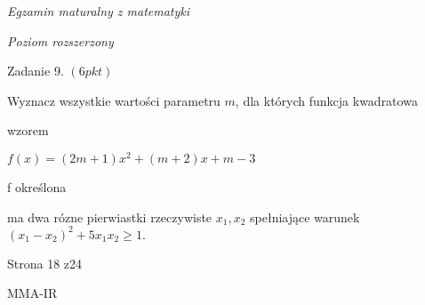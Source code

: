 \documentclass[a4paper,12pt]{article}
\begin{document}
{\it Egzamin maturalny z matematyki}

{\it Poziom rozszerzony}

Zadanie 9. $(6pkt)$

Wyznacz wszystkie wartości parametru $m$, dla których funkcja kwadratowa

wzorem

$f(x)=(2m+1)x^{2}+(m+2)x+m-3$

f określona

ma dwa rózne pierwiastki rzeczywiste $x_{1}, x_{2}$ spełniające warunek $(x_{1}-x_{2})^{2}+5x_{1}x_{2}\geq 1.$

Strona 18 z24

MMA-IR
\end{document}
